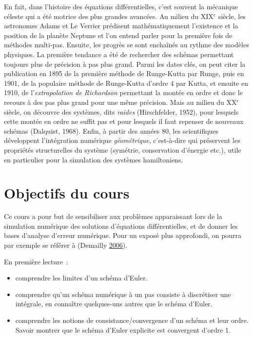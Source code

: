 En fait, dans l'histoire des équations différentielles, c'est souvent la
mécanique céleste qui a été motrice des plus grandes avancées. Au milieu
du XIX\(^e\) siècle, les astronomes Adams et Le Verrier prédisent
mathématiquement l'existence et la position de la planète Neptune et
l'on entend parler pour la première fois de méthodes multi-pas. Ensuite,
les progrès se sont enchaînés au rythme des modèles physiques. La
première tendance a été de rechercher des schémas permettant toujours
plus de précision à pas plus grand. Parmi les dates clés, on peut citer
la publication en 1895 de la première méthode de Runge-Kutta par Runge,
puis en 1901, de la populaire méthode de Runge-Kutta d'ordre 4 par
Kutta, et ensuite en 1910, de l'\emph{extrapolation de Richardson}
permettant la montée en ordre et donc le recours à des pas plus grand
pour une même précision. Mais au milieu du XX\(^e\) siècle, on découvre
des systèmes, dits \emph{raides} (Hirschfelder, 1952), pour lesquels
cette montée en ordre ne suffit pas et pour lesquels il faut repenser de
nouveaux schémas (Dalquist, 1968). Enfin, à partir des années 80, les
scientifiques développent l'intégration numérique \emph{géométrique},
c'est-à-dire qui préservent les propriétés structurelles du système
(symétrie, conservation d'énergie etc.), utile en particulier pour la
simulation des systèmes hamiltoniens.

\hypertarget{ed2-objectifs-du-cours}{%
\chapter{Objectifs du cours}\label{ed2-objectifs-du-cours}}

Ce cours a pour but de sensibiliser aux problèmes apparaissant lors de
la simulation numérique des solutions d'équations différentielles, et de
donner les bases d'analyse d'erreur numérique. Pour un exposé plus
approfondi, on pourra par exemple se référer à (Demailly
\protect\hyperlink{ed2-ref-Dem06}{2006}).

En première lecture~:

\begin{itemize}
\item
  comprendre les limites d'un schéma d'Euler.
\item
  comprendre qu'un schéma numérique à un pas consiste à discrétiser une
  intégrale, en connaître quelques-uns autres que le schéma d'Euler.
\item
  comprendre les notions de consistance/convergence d'un schéma et leur
  ordre. Savoir montrer que le schéma d'Euler explicite est convergent
  d'ordre 1.
\end{itemize}

